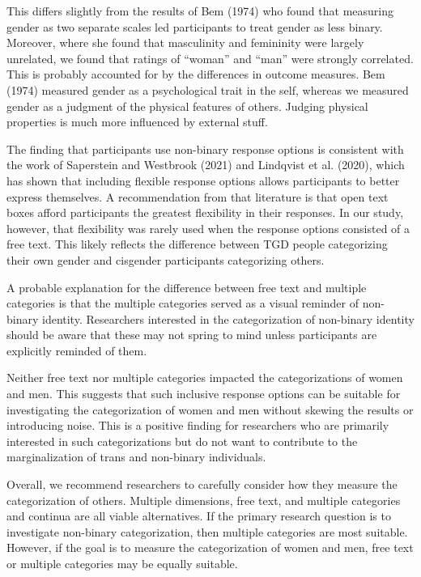 \documentclass[
  man,
  longtable,
  nolmodern,
  notxfonts,
  notimes,
  colorlinks=true,linkcolor=blue,citecolor=blue,urlcolor=blue]{apa7}
\begin{document}
This differs slightly from the results of Bem (1974) who found that
measuring gender as two separate scales led participants to treat gender
as less binary. Moreover, where she found that masculinity and
femininity were largely unrelated, we found that ratings of ``woman''
and ``man'' were strongly correlated. This is probably accounted for by
the differences in outcome measures. Bem (1974) measured gender as a
psychological trait in the self, whereas we measured gender as a
judgment of the physical features of others. Judging physical properties
is much more influenced by external stuff.

The finding that participants use non-binary response options is
consistent with the work of Saperstein and Westbrook (2021) and
Lindqvist et al. (2020), which has shown that including flexible
response options allows participants to better express themselves. A
recommendation from that literature is that open text boxes afford
participants the greatest flexibility in their responses. In our study,
however, that flexibility was rarely used when the response options
consisted of a free text. This likely reflects the difference between
TGD people categorizing their own gender and cisgender participants
categorizing others.

A probable explanation for the difference between free text and multiple
categories is that the multiple categories served as a visual reminder
of non-binary identity. Researchers interested in the categorization of
non-binary identity should be aware that these may not spring to mind
unless participants are explicitly reminded of them.

Neither free text nor multiple categories impacted the categorizations
of women and men. This suggests that such inclusive response options can
be suitable for investigating the categorization of women and men
without skewing the results or introducing noise. This is a positive
finding for researchers who are primarily interested in such
categorizations but do not want to contribute to the marginalization of
trans and non-binary individuals.

Overall, we recommend researchers to carefully consider how they measure
the categorization of others. Multiple dimensions, free text, and
multiple categories and continua are all viable alternatives. If the
primary research question is to investigate non-binary categorization,
then multiple categories are most suitable. However, if the goal is to
measure the categorization of women and men, free text or multiple
categories may be equally suitable.
\end{document}
